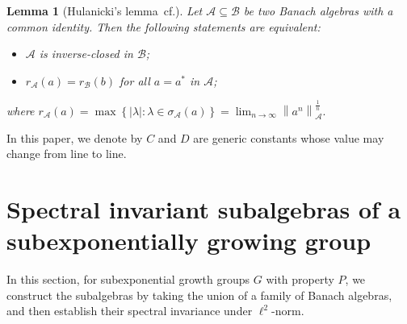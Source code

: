 \documentclass[preprint,11pt]{elsarticle}
\newtheorem{lemma}{Lemma}[section]
\numberwithin{equation}{section}
\begin{document}
	\begin{lemma}[Hulanicki's lemma~cf.\cite{A1972}]
		Let $\mathcal{A}\subseteq \mathcal{B} $ be two Banach algebras with a common identity. Then the following statements are equivalent:
		\begin{itemize}
			\item[(1)] $\mathcal{A}$ is inverse-closed in $\mathcal{B}$;
			\item[(2)] $r _\mathcal{A}(a)=r _\mathcal{B}(b)$ for all $a=a^{*}$ in $\mathcal{A}$;
		\end{itemize}
		where
		$r _\mathcal{A} (a)=\max\left \{ \left | \lambda  \right | :\lambda \in  \sigma _\mathcal{A}(a)\right \}=\lim_{n \to \infty} \left \| a^n \right \|_\mathcal{A}^\frac{1}{n}.$
	\end{lemma}
	In this paper, we denote by $C$ and $D$  are generic constants whose value may change from line to line.
	\section{Spectral invariant subalgebras of a subexponentially growing group}
	In this section, for subexponential growth groups \( G \) with property \( P \), we construct the subalgebras by taking the union of a family of Banach algebras, and then establish their spectral invariance under \(\ell^2\)-norm.
	
\end{document}
